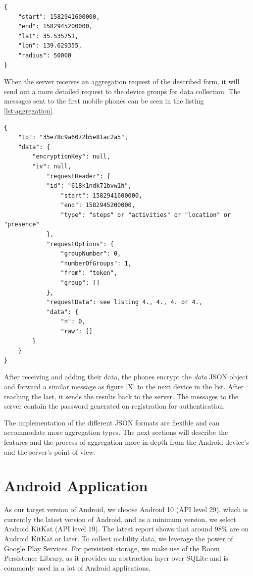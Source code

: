 \begin{lstlisting}[caption=Search options for presence, label={lst:presence}]
{
    "start": 1582941600000,
    "end": 1582945200000,
    "lat": 35.535751,
    "lon": 139.629355,
    "radius": 50000
}
\end{lstlisting}

When the server receives an aggregation request of the described form, it will send out a more detailed request to the device groups for data collection. The messages sent to the first mobile phones can be seen in the listing \ref{lst:aggregation}.

\begin{lstlisting}[caption=First aggregation request sent to the groups, label={lst:aggregation}]
{
	"to": "35e78c9a6072b5e81ac2a5",
	"data": {
		"encryptionKey": null,
		"iv": null,
            "requestHeader": {
			"id": "618k1ndk71bvw1h",
                "start": 1582941600000,
                "end": 1582945200000,
                "type": "steps" or "activities" or "location" or "presence"
            },
            "requestOptions": {
                "groupNumber": 0,
                "numberOfGroups": 1,
                "from": "token",
                "group": []
            },
            "requestData": see listing 4., 4., 4. or 4.,
            "data": {
                "n": 0,
                "raw": []
		}
	}
}
\end{lstlisting}

After receiving and adding their data, the phones encrypt the \textit{data} JSON object and forward a similar message as figure [X] to the next device in the list. After reaching the last, it sends the results back to the server. The messages to the server contain the password generated on registration for authentication.

The implementation of the different JSON formats are flexible and can accommodate more aggregation types. The next sections will describe the features and the process of aggregation more in-depth from the Android device's and the server's point of view.

\section{Android Application}
As our target version of Android, we choose Android 10 (API level 29), which is currently the latest version of Android, and as a minimum version, we select Android KitKat (API level 19). The latest report shows that around 98\% are on Android KitKat or later. To collect mobility data, we leverage the power of Google Play Services. For persistent storage, we make use of the Room Persistence Library, as it provides an abstraction layer over SQLite and is commonly used in a lot of Android applications.

